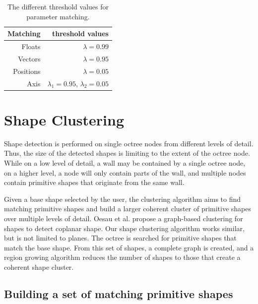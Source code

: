\begin{table}
\centering
\begin{tabular}{ r | r }
    Matching  & threshold values \\
  \hline
  Floats    & $\lambda = 0.99$ \\
  Vectors     & $\lambda = 0.95$ \\
  Positions    & $\lambda = 0.05$ \\ 
  Axis        & $\lambda_1 = 0.95$, $\lambda_2 = 0.05$\\  

\end{tabular}
\caption[Different threshold values for parameter matching]
{The different threshold values for parameter matching.}
\label{tab:matchingThresholds}
\end{table}


\section{Shape Clustering}
\label{sec:shapeClustering}


Shape detection is performed on single octree nodes from different levels of detail. Thus, the size of the detected shapes is limiting to the extent of the octree node. While on a low level of detail, a wall may be contained by a single octree node, on a higher level, a node will only contain parts of the wall, and multiple nodes contain primitive shapes that originate from the same wall. 

\par

Given a base shape selected by the user, the clustering algorithm aims to find matching primitive shapes and build a larger coherent cluster of primitive shapes over multiple levels of detail. Oesau et al. \cite{oesau2016planar} propose a graph-based clustering for shapes to detect coplanar shape. Our shape clustering algorithm works similar, but is not limited to planes. The octree is searched for primitive shapes that match the base shape. From this set of shapes, a complete graph is created, and a region growing algorithm reduces the number of shapes to those that create a coherent shape cluster. 


\subsection{Building a set of matching primitive shapes}
\label{sec:matchingSetBuilding}

